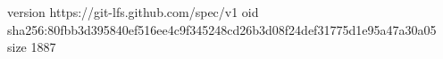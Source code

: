 version https://git-lfs.github.com/spec/v1
oid sha256:80fbb3d395840ef516ee4c9f345248cd26b3d08f24def31775d1e95a47a30a05
size 1887
